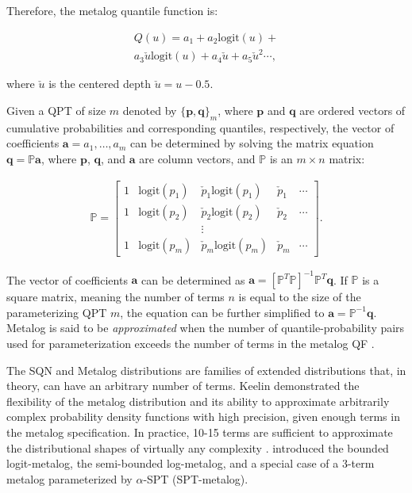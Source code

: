 \documentclass[
  fleqn,
  deca,
  blindrev
]{informs4}
\begin{document}
Therefore, the metalog quantile function is:

\[
\begin{gathered}
Q(u)= a_1+a_2\text{logit}(u)+\\
a_3\check{u}\text{logit}(u)+a_4\check{u}+a_5\check{u}^2\cdots,
\end{gathered}
\]

where \(\check{u}\) is the centered depth \(\check{u}=u-0.5\).

Given a QPT of size \(m\) denoted by \(\{\mathbf{p}, \mathbf{q}\}_m\),
where \(\mathbf{p}\) and \(\mathbf{q}\) are ordered vectors of
cumulative probabilities and corresponding quantiles, respectively, the
vector of coefficients \(\mathbf{a}={a_1,\dots,a_m}\) can be determined
by solving the matrix equation \(\mathbf{q}=\mathbb{P}\mathbf{a}\),
where \(\mathbf{p}\), \(\mathbf{q}\), and \(\mathbf{a}\) are column
vectors, and \(\mathbb{P}\) is an \(m \times n\) matrix:

\[
\begin{gathered}
\mathbb{P} = \left[\begin{array}{lllll}
1  &\text{logit}(p_1) &\check{p}_1\text{logit}(p_1) &\check{p}_1 &\cdots\\
1  &\text{logit}(p_2) &\check{p}_2\text{logit}(p_2) &\check{p}_2 &\cdots\\
   &                  &\vdots\\
1  &\text{logit}(p_m) &\check{p}_m\text{logit}(p_m) &\check{p}_m &\cdots
\end{array}\right].
\end{gathered}
\]

The vector of coefficients \(\mathbf{a}\) can be determined as
\(\mathbf{a}=[\mathbb{P}^{T}\mathbb{P}]^{-1}\mathbb{P}^{T}\mathbf{q}\).
If \(\mathbb{P}\) is a square matrix, meaning the number of terms \(n\)
is equal to the size of the parameterizing QPT \(m\), the equation can
be further simplified to \(\mathbf{a}=\mathbb{P}^{-1}\mathbf{q}\).
Metalog is said to be \emph{approximated} when the number of
quantile-probability pairs used for parameterization exceeds the number
of terms in the metalog QF
\citep{keelin2016MetalogDistributions, perepolkin2021HybridElicitationIndirect}.

The SQN and Metalog distributions are families of extended distributions
that, in theory, can have an arbitrary number of terms. Keelin
\citep{keelin2016MetalogDistributions} demonstrated the flexibility of
the metalog distribution and its ability to approximate arbitrarily
complex probability density functions with high precision, given enough
terms in the metalog specification. In practice, 10-15 terms are
sufficient to approximate the distributional shapes of virtually any
complexity \citep{keelin2021MetalogDistributionsVirtually}.
\citet{keelin2016MetalogDistributions} introduced the bounded
logit-metalog, the semi-bounded log-metalog, and a special case of a
3-term metalog parameterized by \(\alpha\)-SPT (SPT-metalog).
\end{document}
